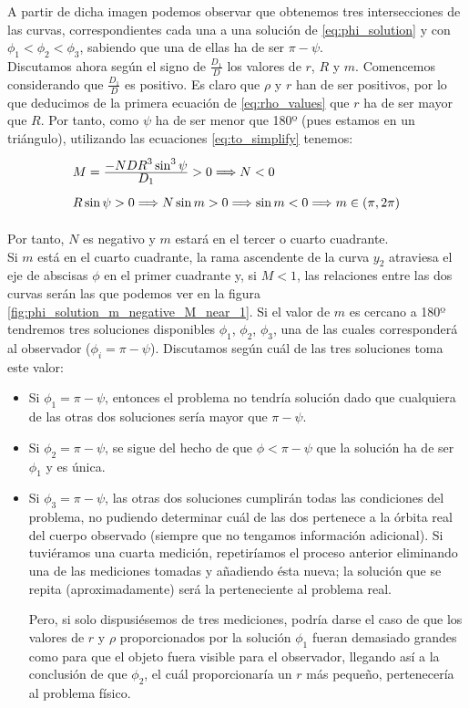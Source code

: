 A partir de dicha imagen podemos observar que obtenemos tres intersecciones de las curvas, correspondientes cada una a una solución de \eqref{eq:phi_solution} y con $\phi_1<\phi_2<\phi_3$, sabiendo que una de ellas ha de ser $\pi-\psi$.\\

Discutamos ahora según el signo de $\frac{D_1}{D}$ los valores de $r$, $R$ y $m$. Comencemos considerando que $\frac{D_1}{D}$ es positivo. Es claro que $\rho$ y $r$ han de ser positivos, por lo que deducimos de la primera ecuación de \eqref{eq:rho_values} que $r$ ha de ser mayor que $R$. Por tanto, como $\psi$ ha de ser menor que 180º (pues estamos en un triángulo), utilizando las ecuaciones \eqref{eq:to_simplify} tenemos:
\[
\def\arraystretch{2}
\begin{array}{l}
M=\ddfrac{-NDR^3\sin^3{\psi}}{D_1}>0 \Longrightarrow N<0 \\
R\sin{\psi}>0 \Longrightarrow N\sin{m}>0 \Longrightarrow \sin{m}<0 \Longrightarrow m\in(\pi,2\pi)
\end{array}
\]

Por tanto, $N$ es negativo y $m$ estará en el tercer o cuarto cuadrante.\\

Si $m$ está en el cuarto cuadrante, la rama ascendente de la curva $y_2$ atraviesa el eje de abscisas $\phi$ en el primer cuadrante y, si $M<1$, las relaciones entre las dos curvas serán las que podemos ver en la figura \ref{fig:phi_solution_m_negative_M_near_1}. Si el valor de $m$ es cercano a 180º tendremos tres soluciones disponibles $\phi_1$, $\phi_2$, $\phi_3$, una de las cuales corresponderá al observador ($\phi_i=\pi-\psi$). Discutamos según cuál de las tres soluciones toma este valor:
\begin{itemize}
\item Si $\phi_1=\pi-\psi$, entonces el problema no tendría solución dado que cualquiera de las otras dos soluciones sería mayor que $\pi-\psi$.
\item Si $\phi_2=\pi-\psi$, se sigue del hecho de que $\phi<\pi-\psi$ que la solución ha de ser $\phi_1$ y es única.
\item Si $\phi_3=\pi-\psi$, las otras dos soluciones cumplirán todas las condiciones del problema, no pudiendo determinar cuál de las dos pertenece a la órbita real del cuerpo observado (siempre que no tengamos información adicional). Si tuviéramos una cuarta medición, repetiríamos el proceso anterior eliminando una de las mediciones tomadas y añadiendo ésta nueva; la solución que se repita (aproximadamente) será la perteneciente al problema real.

Pero, si solo dispusiésemos de tres mediciones, podría darse el caso de que los valores de $r$ y $\rho$ proporcionados por la solución $\phi_1$ fueran demasiado grandes como para que el objeto fuera visible para el observador, llegando así a la conclusión de que $\phi_2$, el cuál proporcionaría un $r$ más pequeño, pertenecería al problema físico.
\end{itemize} 

